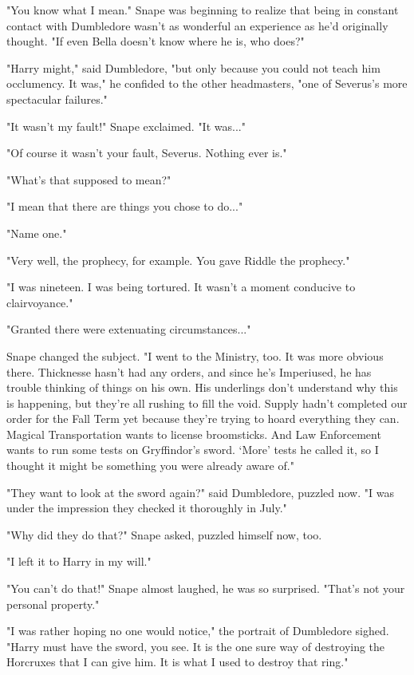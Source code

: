 \documentclass[a4paper,11pt]{article}
\begin{document}
"You know what I mean." Snape was beginning to realize that being in constant contact with Dumbledore wasn't as wonderful an experience as he'd originally thought. "If even Bella doesn't know where he is, who does?"

"Harry might," said Dumbledore, "but only because you could not teach him occlumency. It was," he confided to the other headmasters, "one of Severus's more spectacular failures."

"It wasn't my fault!" Snape exclaimed. "It was..."

"Of course it wasn't your fault, Severus. Nothing ever is."

"What's that supposed to mean?"

"I mean that there are things you chose to do..."

"Name one."

"Very well, the prophecy, for example. You gave Riddle the prophecy."

"I was nineteen. I was being tortured. It wasn't a moment conducive to clairvoyance."

"Granted there were extenuating circumstances..."

Snape changed the subject. "I went to the Ministry, too. It was more obvious there. Thicknesse hasn't had any orders, and since he's Imperiused, he has trouble thinking of things on his own. His underlings don't understand why this is happening, but they're all rushing to fill the void. Supply hadn't completed our order for the Fall Term yet because they're trying to hoard everything they can. Magical Transportation wants to license broomsticks. And Law Enforcement wants to run some tests on Gryffindor's sword. `More' tests he called it, so I thought it might be something you were already aware of."

"They want to look at the sword again?" said Dumbledore, puzzled now. "I was under the impression they checked it thoroughly in July."

"Why did they do that?" Snape asked, puzzled himself now, too.

"I left it to Harry in my will."

"You can't do that!" Snape almost laughed, he was so surprised. "That's not your personal property."

"I was rather hoping no one would notice," the portrait of Dumbledore sighed. "Harry must have the sword, you see. It is the one sure way of destroying the Horcruxes that I can give him. It is what I used to destroy that ring."
\end{document}
